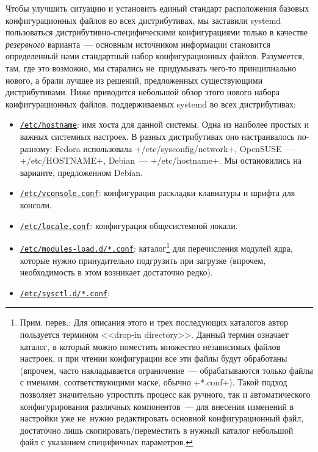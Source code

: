 \documentclass[10pt,oneside,a4paper]{article}
\newcommand{\hreftt}[2]{\href{#1}{\texttt{#2}}}
\begin{document}
Чтобы улучшить ситуацию и установить единый стандарт расположения базовых
конфигурационных файлов во всех дистрибутивах, мы заставили systemd пользоваться
дистрибутивно-специфическими конфигурациями только в качестве \emph{резервного}
варианта~--- основным источником информации становится определенный нами
стандартный набор конфигурационных файлов. Разумеется, там, где это возможно, мы
старались не~придумывать чего-то принципиально нового, а брали лучшее из
решений, предложенных существующими дистрибутивами. Ниже приводится небольшой
обзор этого нового набора конфигурационных файлов, поддерживаемых systemd во
всех дистрибутивах:
\begin{itemize}
	\item
		\hreftt{http://0pointer.de/public/systemd-man/hostname.html}{/etc/hostname}:
		имя хоста для данной системы. Одна из наиболее простых и важных
		системных настроек. В разных дистрибутивах оно настраивалось
		по-разному: Fedora использовала +/etc/sysconfig/network+,
		OpenSUSE~--- +/etc/HOSTNAME+, Debian~--- +/etc/hostname+. Мы
		остановились на варианте, предложенном Debian.
	\item
		\hreftt{http://0pointer.de/public/systemd-man/vconsole.conf.html}{/etc/vconsole.conf}:
		конфигурация раскладки клавиатуры и шрифта для консоли.
	\item
		\hreftt{http://0pointer.de/public/systemd-man/locale.conf.html}{/etc/locale.conf}:
		конфигурация общесистемной локали.
	\item
		\hreftt{http://0pointer.de/public/systemd-man/modules-load.d.html}{/etc/modules-load.d/*.conf}:
		каталог\footnote{Прим. перев.: Для описания этого и трех
		последующих каталогов автор пользуется термином <<drop-in
		directory>>. Данный термин означает каталог, в который можно
		поместить множество независимых файлов настроек, и при чтении
		конфигурации все эти файлы будут обработаны (впрочем, часто
		накладывается ограничение~--- обрабатываются только файлы с
		именами, соответствующими маске, обычно +*.conf+). Такой подход
		позволяет значительно упростить процесс как ручного, так и
		автоматического конфигурирования различных компонентов~--- для
		внесения изменений в настройки уже не~нужно редактировать
		основной конфигурационный файл, достаточно лишь
		скопировать/переместить в нужный каталог небольшой файл с
		указанием специфичных параметров.} для перечисления модулей
		ядра, которые нужно принудительно подгрузить при загрузке
		(впрочем, необходимость в этом возникает достаточно редко).
	\item
		\hreftt{http://0pointer.de/public/systemd-man/sysctl.d.html}{/etc/sysctl.d/*.conf}:

\end{itemize}
\end{document}
